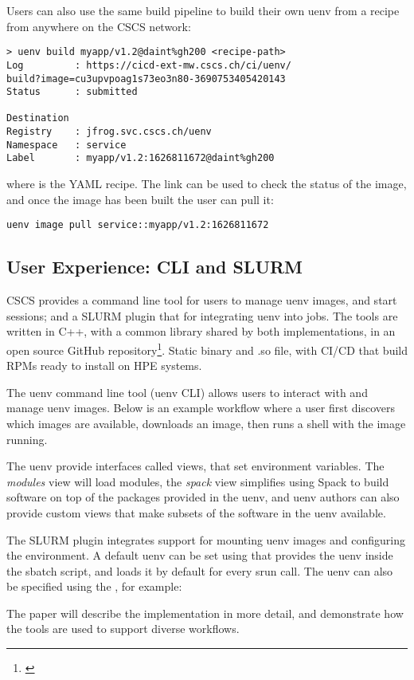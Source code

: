 Users can also use the same build pipeline to build their own uenv from a recipe from anywhere on the CSCS network:
\begin{lstlisting}
> uenv build myapp/v1.2@daint%gh200 <recipe-path>
Log         : https://cicd-ext-mw.cscs.ch/ci/uenv/
build?image=cu3upvpoag1s73eo3n80-3690753405420143
Status      : submitted

Destination
Registry    : jfrog.svc.cscs.ch/uenv
Namespace   : service
Label       : myapp/v1.2:1626811672@daint%gh200
\end{lstlisting}
where  is the YAML recipe.
The link can be used to check the status of the image, and once the image has been built the user can pull it:
\begin{lstlisting}
uenv image pull service::myapp/v1.2:1626811672
\end{lstlisting}

\subsection{User Experience: CLI and SLURM}
\label{sec:cli}

CSCS provides a command line tool for users to manage uenv images, and start sessions; and a SLURM plugin that for integrating uenv into jobs.
The tools are written in C++, with a common library shared by both implementations, in an open source GitHub repository\footnote{\href{https://github.com/eth-cscs/uenv2}{}}.
Static binary and .so file, with CI/CD that build RPMs ready to install on HPE systems.

The uenv command line tool (uenv CLI) allows users to interact with and manage uenv images.
Below is an example workflow where a user first discovers which images are available, downloads an image, then runs a shell with the image running.



The uenv provide interfaces called views, that set environment variables.
The \emph{modules} view will load modules, the \emph{spack} view simplifies using Spack to build software on top of the packages provided in the uenv, and uenv authors can also provide custom views that make subsets of the software in the uenv available.

The SLURM plugin integrates support for mounting uenv images and configuring the environment.
A default uenv can be set using  that provides the uenv inside the sbatch script, and loads it by default for every srun call.
The uenv can also be specified using the , for example:


The paper will describe the implementation in more detail, and demonstrate how the tools are used to support diverse workflows.

